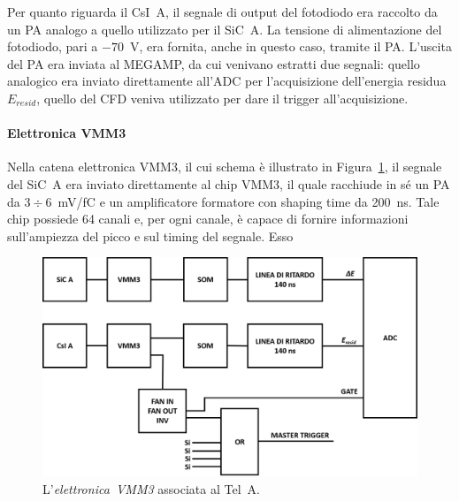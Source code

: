 Per quanto riguarda il CsI~A, il segnale di output del fotodiodo era raccolto da un PA analogo a quello utilizzato per il SiC~A.
La tensione di alimentazione del fotodiodo, pari a $-70$~V, era fornita, anche in questo caso, tramite il PA.
L'uscita del PA era inviata al MEGAMP, da cui venivano estratti due segnali: quello analogico era inviato direttamente all'ADC per l'acquisizione dell'energia residua $E_{resid}$, quello del CFD veniva utilizzato per dare il trigger all'acquisizione.




\paragraph{Elettronica VMM3} 
Nella catena elettronica VMM3, il cui schema è illustrato in Figura~\ref{fig:elettronica_vmm}, il segnale del SiC~A era inviato direttamente al chip VMM3, il quale racchiude in sé un PA da $3 \div 6$~mV/fC e un amplificatore formatore con shaping time da 200~ns.
Tale chip possiede 64 canali e, per ogni canale, è capace di fornire informazioni sull'ampiezza del picco e sul timing del segnale. 
Esso 




\begin{figure} [!p]
	\centering
	\includegraphics[width=\textwidth, keepaspectratio]{Grafici/elettronica_vmm.png}
	\caption{L'\emph{elettronica~VMM3} associata al Tel~A.} \label{fig:elettronica_vmm}
\end{figure}

